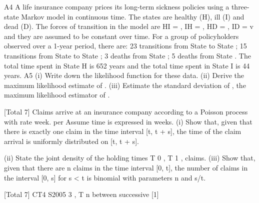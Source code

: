 \documentclass[a4paper,12pt]{article}
\begin{document}
\begin{enumerate}

A4
A life insurance company prices its long-term sickness policies using a three-state
Markov model in continuous time. The states are healthy (H), ill (I) and dead (D). The
forces of transition in the model are HI = , IH = , HD = , ID = v and they are
assumed to be constant over time.
For a group of policyholders observed over a 1-year period, there are:
23 transitions from State to State ;
15 transitions from State to State ;
3 deaths from State ;
5 deaths from State .
The total time spent in State H is 652 years and the total time spent in State I is 44
years.
A5
(i) Write down the likelihood function for these data. 
(ii) Derive the maximum likelihood estimate of . 
(iii) Estimate the standard deviation of
, the maximum likelihood estimator of .

[Total 7]
Claims arrive at an insurance company according to a Poisson process with rate
week.
per
Assume time is expressed in weeks.
(i) Show that, given that there is exactly one claim in the time interval [t, t + s],
the time of the claim arrival is uniformly distributed on [t, t + s].

(ii) State the joint density of the holding times T 0 , T 1 ,
claims.
(iii) Show that, given that there are n claims in the time interval [0, t], the number
of claims in the interval [0, s] for s < t is binomial with parameters n and s/t.

[Total 7]
CT4 S2005
3
, T n between successive
[1]




\end{enumerate}
\end{document}
